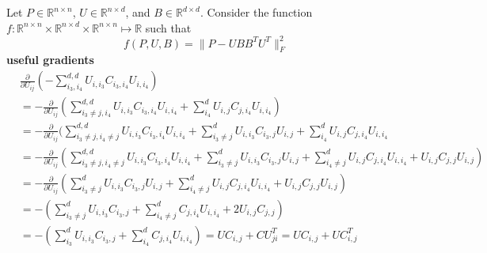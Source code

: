 \documentclass{report}
\begin{document}
   	\newpage
   	Let $ P \in \mathbb{R}^{n \times n} $, $ U \in \mathbb{R}^{n \times d} $, and $B \in \mathbb{R}^{d \times d} $. Consider the function $ f: \mathbb{R}^{n \times n} \times \mathbb{R}^{n \times d} \times \mathbb{R}^{n \times n} \mapsto \mathbb{R} $ such that 
   	\[ 
   	  f(P,U,B) = \|P - UBB^TU^T\|_F^2
   	\]
   	\textbf{useful gradients}
   	\begin{align*}
   	&\frac{\partial}{\partial U_{ij}} (- \sum_{i_3,i_4}^{d,d}U_{i,i_3}C_{i_3,i_4}U_{i,i_4}) \\
   	&=  -\frac{\partial}{\partial U_{ij}} (\sum_{i_3 \neq j,i_4}^{d,d}U_{i,i_3}C_{i_3,i_4}U_{i,i_4} 
   	+ \sum_{i_4}^{d}U_{i,j}C_{j,i_4}U_{i,i_4}) \\
   	&= -\frac{\partial}{\partial U_{ij}} (\sum_{i_3 \neq j,i_4 \neq j}^{d,d}U_{i,i_3}C_{i_3,i_4}U_{i,i_4} 
   	+ \sum_{i_3 \neq j}^{d}U_{i,i_3}C_{i_3,j}U_{i,j} 
   	+ \sum_{i_4}^{d}U_{i,j}C_{j,i_4}U_{i,i_4}\\
   	&= -\frac{\partial}{\partial U_{ij}} (\sum_{i_3 \neq j,i_4 \neq j}^{d,d}U_{i,i_3}C_{i_3,i_4}U_{i,i_4} 
   	+ \sum_{i_3 \neq j}^{d}U_{i,i_3}C_{i_3,j}U_{i,j} 
   	+ \sum_{i_4 \neq j}^{d}U_{i,j}C_{j,i_4}U_{i,i_4} 
   	+ U_{i,j}C_{j,j}U_{i,j} )\\
   	&= -\frac{\partial}{\partial U_{ij}} (
   	\sum_{i_3 \neq j}^{d}U_{i,i_3}C_{i_3,j}U_{i,j} 
   	+ \sum_{i_4 \neq j}^{d}U_{i,j}C_{j,i_4}U_{i,i_4} 
   	+ U_{i,j}C_{j,j}U_{i,j} ) \\
   	&= -(
   	\sum_{i_3 \neq j}^{d}U_{i,i_3}C_{i_3,j} 
   	+ \sum_{i_4 \neq j}^{d}C_{j,i_4}U_{i,i_4} 
   	+ 2U_{i,j}C_{j,j})\\
   	&= -(
   	\sum_{i_3}^{d}U_{i,i_3}C_{i_3,j} + \sum_{i_4}^{d}C_{j,i_4}U_{i,i_4})  
   	=UC_{i,j} + CU^T_{ji} = UC_{i,j} + UC^T_{i,j}
   	\end{align*}
   	
\end{document}
